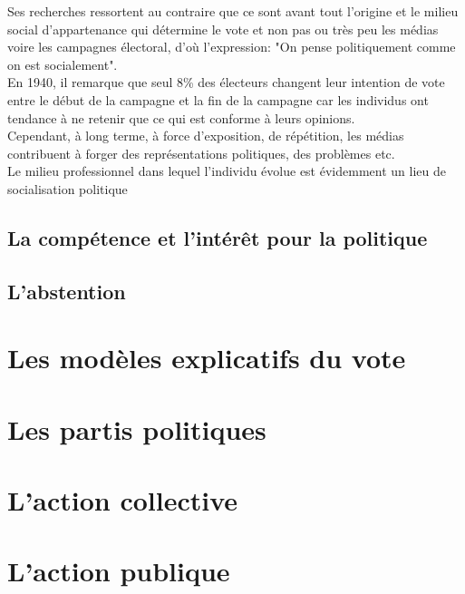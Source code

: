 \documentclass[12pt, a4paper, openany]{book}
\begin{document}
Ses recherches ressortent au contraire que ce sont avant tout l'origine et le milieu social d'appartenance qui détermine le vote et non pas ou très peu les médias voire les campagnes électoral, d'où l'expression: "On pense politiquement comme on est socialement". \\
En 1940, il remarque que seul 8\% des électeurs changent leur intention de vote entre le début de la campagne et la fin de la campagne car les individus ont tendance à ne retenir que ce qui est conforme à leurs opinions. \\
Cependant, à long terme, à force d'exposition, de répétition, les médias contribuent à forger des représentations politiques, des problèmes etc. \\
Le milieu professionnel dans lequel l'individu évolue est évidemment un lieu de socialisation politique

\section{La compétence et l'intérêt pour la politique}




\section{L'abstention}



\chapter{Les modèles explicatifs du vote}







\chapter{Les partis politiques}






\chapter{L'action collective}







\chapter{L'action publique}
\end{document}
